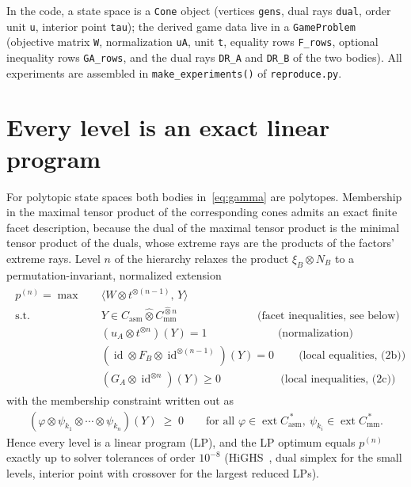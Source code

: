 \documentclass[11pt,a4paper]{article}
\newcommand*{\tmax}{\hat{\otimes}}
\newcommand*{\lrbracket}[1]{\left(#1\right)}
\DeclareMathOperator{\ext}{ext}
\newcommand*{\Casm}{C_{\mathrm{asm}}}
\newcommand*{\Cmm}{C_{\mathrm{mm}}}
\newcommand*{\code}[1]{\texttt{#1}}
\theoremstyle{remark}
\begin{document}
{\sloppy
In the code, a state space is a \code{Cone} object (vertices \code{gens},
dual rays \code{dual}, order unit \code{u}, interior point \code{tau});
the derived game data live in a \code{GameProblem}
(objective matrix \code{W}, normalization \code{uA}, unit \code{t},
equality rows \code{F\_rows}, optional inequality rows \code{GA\_rows},
and the dual rays \code{DR\_A} and \code{DR\_B} of the two bodies). All
experiments are assembled in \code{make\_experiments()} of
\code{reproduce.py}.\par}

\section{Every level is an exact linear program}\label{sec:lp}

For polytopic state spaces both bodies in~\eqref{eq:gamma} are polytopes.
Membership in the maximal tensor product of the corresponding cones admits
an exact finite facet description, because the dual of the maximal tensor
product is the minimal tensor product of the duals, whose extreme rays are
the products of the factors' extreme rays. Level $n$ of the hierarchy
relaxes the product $\xi_B\otimes N_B$ to a permutation-invariant,
normalized extension
\begin{align}\label{eq:leveln}
\begin{split}
    p^{(n)} = \max\quad & \big\langle W\otimes t^{\otimes(n-1)},\, Y\big\rangle\\
    \text{s.t.}\quad
    & Y \in \Casm\tmax \Cmm^{\tmax n}
      \qquad\qquad\qquad\quad\ \text{(facet inequalities, see below)}\\
    & \lrbracket{u_A\otimes t^{\otimes n}}(Y)=1
      \qquad\qquad\qquad\ \, \text{(normalization)}\\
    & \lrbracket{\operatorname{id}\otimes F_B\otimes \operatorname{id}^{\otimes(n-1)}}(Y)=0
      \qquad\ \text{(local equalities, (2b))}\\
    & \lrbracket{G_A\otimes \operatorname{id}^{\otimes n}}(Y)\geq 0
      \qquad\qquad\quad\ \, \text{(local inequalities, (2c))}
\end{split}
\end{align}
with the membership constraint written out as
\begin{align}\label{eq:facets}
    \lrbracket{\varphi\otimes\psi_{k_1}\otimes\cdots\otimes\psi_{k_n}}(Y)\;\geq\;0
    \qquad \text{for all }\varphi\in\ext \Casm^{\,*},\
    \psi_{k_i}\in\ext \Cmm^{\,*}.
\end{align}
Hence every level is a linear program (LP), and the LP optimum equals
$p^{(n)}$ exactly up to solver tolerances of order $10^{-8}$
(HiGHS~\cite{HiGHS}, dual simplex for the small levels, interior point with
crossover for the largest reduced LPs).
\end{document}

